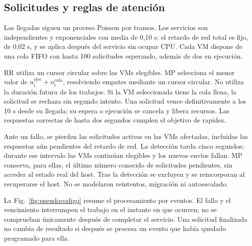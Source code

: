 \subsection{Solicitudes y reglas de atención}
Las llegadas siguen un proceso Poisson por tramos. Los servicios son independientes y exponenciales con media de 0,10 s; el retardo de red total es fijo, de 0,02 s, y se aplica después del servicio sin ocupar CPU. Cada VM dispone de una cola FIFO con hasta 100 solicitudes esperando, además de dos en ejecución.

RR utiliza un cursor circular sobre las VMs elegibles. MP selecciona el menor valor de $n_i^{\mathrm{ejec}}+n_i^{\mathrm{cola}}$, resolviendo empates mediante un cursor circular. No utiliza la duración futura de los trabajos. Si la VM seleccionada tiene la cola llena, la solicitud se rechaza sin segundo intento. Una solicitud vence definitivamente a los 10 s desde su llegada; su espera o ejecución se cancela y libera recursos. Las respuestas correctas de hasta dos segundos cumplen el objetivo de rapidez.

Ante un fallo, se pierden las solicitudes activas en las VMs afectadas, incluidas las respuestas aún pendientes del retardo de red. La detección tarda cinco segundos; durante ese intervalo las VMs continúan elegibles y los nuevos envíos fallan. MP conserva, para ellas, el último número conocido de solicitudes pendientes, sin acceder al estado real del host. Tras la detección se excluyen y se reincorporan al recuperarse el host. No se modelaron reintentos, migración ni autoescalado.

La Fig.~\ref{fig:pseudocodigo} resume el procesamiento por eventos. El fallo y el vencimiento interrumpen el trabajo en el instante en que ocurren; no se comprueban únicamente después de completar el servicio. Una solicitud finalizada no cambia de resultado si después se procesa un evento que había quedado programado para ella.

